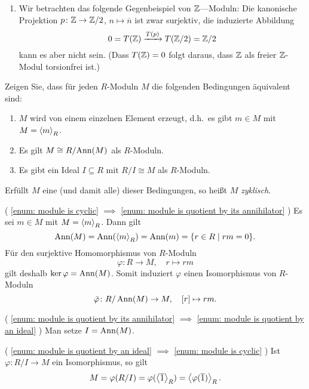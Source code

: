 \begin{solution}
\begin{enumerate}
    \item
      Wir betrachten das folgende Gegenbeispiel von $\mathbb{Z}$—Moduln:
      Die kanonische Projektion $p \colon \mathbb{Z} \to \mathbb{Z}/2$, $n \mapsto \overline{n}$ ist zwar surjektiv, die induzierte Abbildung
      \[
                                  0
        =                         T(\mathbb{Z})
        \xrightarrow{T(p)} T(\mathbb{Z}/2)
        =                         \mathbb{Z}/2
      \]
      kann es aber nicht sein. (Dass $T(\mathbb{Z}) = 0$ folgt daraus, dass $\mathbb{Z}$ als freier $\mathbb{Z}$-Modul torsionfrei ist.)
  \end{enumerate}
\end{solution}


\begin{question}
  Zeigen Sie, dass für jeden $R$-Moduln $M$ die folgenden Bedingungen äquivalent sind:
  \begin{enumerate}
    \item
      \label{enum: module is cyclic}
      $M$ wird von einem einzelnen Element erzeugt, d.h.\ es gibt $m \in M$ mit $M = \left\langle m \right\rangle_R$.
    \item
      \label{enum: module is quotient by its annihilator}
      Es gilt $M \cong R/\!\operatorname{Ann}(M)$ als $R$-Moduln.
    \item
      \label{enum: module is quotient by an ideal}
      Es gibt ein Ideal $I \subseteq R$ mit $R/I \cong M$ als $R$-Moduln.
  \end{enumerate}
  Erfüllt $M$ eine (und damit alle) dieser Bedingungen, so heißt $M$ \emph{zyklisch}.
\end{question}


\begin{solution}
  (
    \ref{enum: module is cyclic}
    $\implies$
    \ref{enum: module is quotient by its annihilator}
  )
  Es sei $m \in M$ mit $M = \left\langle m \right\rangle_R$.
  Dann gilt
  \[
      \operatorname{Ann}(M)
    = \operatorname{Ann}(\left\langle m \right\rangle_R)
    = \operatorname{Ann}(m)
    = \{r \in R \mid rm = 0\}.
  \]
  Für den surjektive Homomorphismus von $R$-Moduln
  \[
            \varphi
    \colon  R \to M,
    \quad
            r \mapsto rm
  \]
  gilt deshalb $\ker \varphi = \operatorname{Ann}(M)$.
  Somit induziert $\varphi$ einen Isomorphismus von $R$-Moduln
  \[
            \bar{\varphi}
    \colon  R/\operatorname{Ann}(M) \to M,
    \quad
            [r] \mapsto rm.
  \]
  
  (
    \ref{enum: module is quotient by its annihilator}
    $\implies$
    \ref{enum: module is quotient by an ideal}
  )
  Man setze $I = \operatorname{Ann}(M)$.
  
  (
    \ref{enum: module is quotient by an ideal}
    $\implies$
    \ref{enum: module is cyclic}
  )
  Ist $\varphi \colon R/I \to M$ ein Isomorphismus, so gilt
  \[
      M
    = \varphi(R/I)
    = \varphi(\left\langle \overline{1} \right\rangle_R)
    = \left\langle \varphi(\overline{1}) \right\rangle_R.
  \]
\end{solution}


